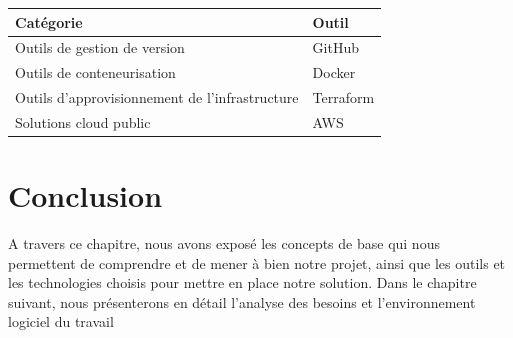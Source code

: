\begin{table}[H]
\centering
\caption{Tableau récapitulatif des choix technologiques.}
\begin{longtable}{|p{10cm}|p{4cm}|}
\hline
\textbf{Catégorie} & \textbf{Outil} \\
\hline
Outils de gestion de version & GitHub  \\
\hline
Outils de conteneurisation & Docker \\
\hline
Outils d'approvisionnement de l'infrastructure  & Terraform \\
\hline
Solutions cloud public & AWS \\
\hline
\end{longtable}
\label{tableau:choix}
\end{table}

\section*{Conclusion}
A travers ce chapitre, nous avons exposé les concepts de base qui nous permettent de comprendre et de mener à bien notre projet, ainsi que les outils et les technologies choisis pour mettre en place notre solution. Dans le chapitre suivant, nous présenterons en détail l’analyse des besoins et l’environnement logiciel du travail
